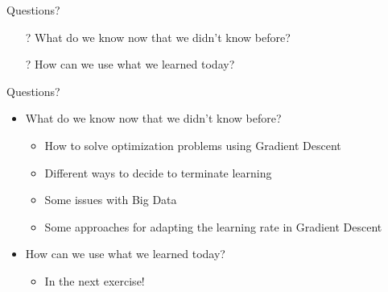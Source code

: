 \documentclass[aspectratio=169]{beamer}
\begin{document}
\begin{frame}{Questions?}
\begin{itemize}
	\item[?] What do we know now that we didn't know before?
	\vspace{2em}
	\item[?] How can we use what we learned today?
\end{itemize}
\end{frame}

\begin{frame}{Questions?}
\begin{itemize}
	\item What do we know now that we didn't know before?
	\begin{itemize}
		\item How to solve optimization problems using Gradient Descent
		\item Different ways to decide to terminate learning
		\item Some issues with Big Data
		\item Some approaches for adapting the learning rate in Gradient Descent
	\end{itemize}
	\vspace{2em}
	\item How can we use what we learned today?
	\begin{itemize}
	\item In the next exercise!
	\end{itemize}
\end{itemize}
\end{frame}
\end{document}
